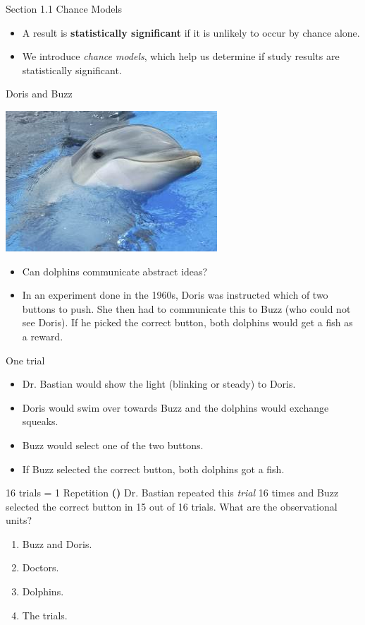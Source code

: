 \documentclass[13pt]{beamer}
\newcounter{count}
\newcommand{\question}{ \textbf{(\decimal{count})} \stepcounter{count}}
\newenvironment{stepitemize}{\begin{itemize}[<+->]}{\end{itemize} }
\begin{document}
\begin{frame}{Section 1.1 Chance Models}
\begin{stepitemize}
  \item A result is \textbf{statistically significant} if it is unlikely to occur by chance alone. 
  \item We introduce \textit{chance models}, which help us determine if study results are statistically significant.
\end{stepitemize}
\end{frame}

\begin{frame}{Doris and Buzz}
\begin{center}
\includegraphics[width=2.37 in]{dolphin1.jpg}
\end{center}
\begin{stepitemize}
  \item Can dolphins communicate abstract ideas? 
  \item In an experiment done in the 1960s, Doris was instructed which of two buttons to push.  She then had to communicate this to Buzz (who could not see Doris).  If he picked the correct button, both dolphins would get a fish as a reward. 
\end{stepitemize}
\end{frame}

\begin{frame}{One trial}
\begin{stepitemize}
  \item Dr. Bastian would show the light (blinking or steady) to Doris. 
  \item Doris would swim over towards Buzz and the dolphins would exchange squeaks.
  \item Buzz would select one of the two buttons.
  \item If Buzz selected the correct button, both dolphins got a fish.
\end{stepitemize}
 \end{frame}

\begin{frame}{16 trials = 1 Repetition}
\question Dr. Bastian repeated this \textit{trial} 16 times and Buzz selected the correct button in 15 out of 16 trials. What are the observational units?
\begin{enumerate}[A]
  \item Buzz and Doris.%
  \item Doctors.
  \item Dolphins.
  \item The trials.%
\end{enumerate}
\end{frame}
\end{document}
